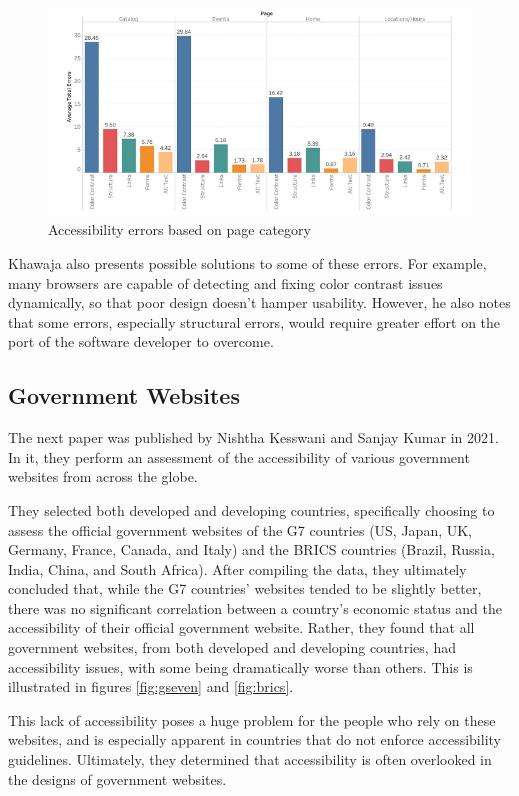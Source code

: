 \documentclass{article}
\begin{document}
\begin{figure}
	\centering
	\includegraphics[width=1\textwidth]{images/librarygraph.png}
	\caption{Accessibility errors based on page category \cite{Library}}
	\label{fig:library}
\end{figure}

Khawaja also presents possible solutions to some of these errors.
For example, many browsers are capable of detecting and fixing color contrast issues dynamically, so that poor design doesn't hamper usability.
However, he also notes that some errors, especially structural errors, would require greater effort on the port of the software developer to overcome.

\subsection{Government Websites}
The next paper was published by Nishtha Kesswani and Sanjay Kumar in 2021.
\cite{Government}
In it, they perform an assessment of the accessibility of various government websites from across the globe.

They selected both developed and developing countries, specifically choosing to assess the official government websites of the G7 countries (US, Japan, UK, Germany, France, Canada, and Italy) and the BRICS countries (Brazil, Russia, India, China, and South Africa).
After compiling the data, they ultimately concluded that, while the G7 countries' websites tended to be slightly better, there was no significant correlation between a country's economic status and the accessibility of their official government website.
Rather, they found that all government websites, from both developed and developing countries, had accessibility issues, with some being dramatically worse than others.
This is illustrated in figures \ref{fig:gseven} and \ref{fig:brics}.

This lack of accessibility poses a huge problem for the people who rely on these websites, and is especially apparent in countries that do not enforce accessibility guidelines.
Ultimately, they determined that accessibility is often overlooked in the designs of government websites.
\end{document}
